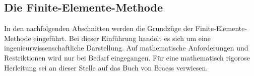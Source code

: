 \subsection{Die Finite-Elemente-Methode}

In den nachfolgenden Abschnitten werden die Grundzüge der Finite-Elemente-Methode eingeführt. Bei dieser Einführung handelt es sich um eine ingenieurwissenschaftliche Darstellung. Auf mathematische Anforderungen und Restriktionen wird nur bei Bedarf eingegangen. Für eine mathematisch rigorose Herleitung sei an dieser Stelle auf das Buch von Braess \cite{braess2013finite} verwiesen.